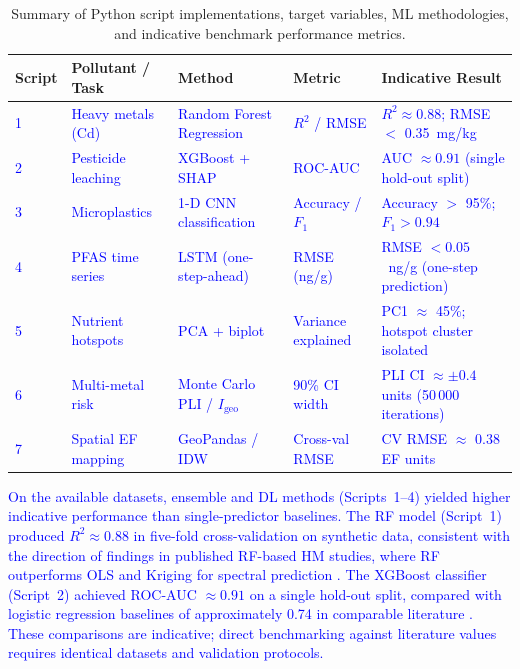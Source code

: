 \documentclass[environments,article,submit,pdftex,moreauthors]{Definitions/mdpi}
\begin{document}
\begin{table}[H]
\caption{Summary of Python script implementations, target variables,
    ML methodologies, and indicative benchmark performance
    metrics.\label{tab:script_results}}
\begin{tabularx}{\textwidth}{@{} p{1.0cm} p{2.8cm} p{2.5cm} p{2.5cm} X @{}}
\toprule
\textbf{Script} & \textbf{Pollutant / Task}
    & \textbf{Method}
    & \textbf{Metric}
    & \textbf{Indicative Result} \\
\midrule
\textcolor{blue}{1} & \textcolor{blue}{Heavy metals (Cd)}
    & \textcolor{blue}{Random Forest Regression}
    & \textcolor{blue}{$R^2$ / RMSE}
    & \textcolor{blue}{$R^2 \approx 0.88$; RMSE $<$ 0.35~mg/kg} \\[4pt]
\textcolor{blue}{2} & \textcolor{blue}{Pesticide leaching}
    & \textcolor{blue}{XGBoost + SHAP}
    & \textcolor{blue}{ROC-AUC}
    & \textcolor{blue}{AUC $\approx 0.91$ (single hold-out split)} \\[4pt]
\textcolor{blue}{3} & \textcolor{blue}{Microplastics}
    & \textcolor{blue}{1-D CNN classification}
    & \textcolor{blue}{Accuracy / $F_1$}
    & \textcolor{blue}{Accuracy $>$ 95\%; $F_1 > 0.94$} \\[4pt]
\textcolor{blue}{4} & \textcolor{blue}{PFAS time series}
    & \textcolor{blue}{LSTM (one-step-ahead)}
    & \textcolor{blue}{RMSE (ng/g)}
    & \textcolor{blue}{RMSE $< 0.05$~ng/g (one-step prediction)} \\[4pt]
\textcolor{blue}{5} & \textcolor{blue}{Nutrient hotspots}
    & \textcolor{blue}{PCA + biplot}
    & \textcolor{blue}{Variance explained}
    & \textcolor{blue}{PC1 $\approx$ 45\%; hotspot cluster isolated} \\[4pt]
\textcolor{blue}{6} & \textcolor{blue}{Multi-metal risk}
    & \textcolor{blue}{Monte Carlo PLI / $I_\mathrm{geo}$}
    & \textcolor{blue}{90\% CI width}
    & \textcolor{blue}{PLI CI $\approx \pm 0.4$ units (50\,000 iterations)} \\[4pt]
\textcolor{blue}{7} & \textcolor{blue}{Spatial EF mapping}
    & \textcolor{blue}{GeoPandas / IDW}
    & \textcolor{blue}{Cross-val RMSE}
    & \textcolor{blue}{CV RMSE $\approx$ 0.38 EF units} \\
\bottomrule
\end{tabularx}
\end{table}

\textcolor{blue}{On the available datasets, ensemble and DL methods (Scripts~1--4) yielded higher indicative performance than single-predictor baselines. The RF model (Script~1) produced $R^2 \approx 0.88$ in five-fold cross-validation on synthetic data, consistent with the direction of findings in published RF-based HM studies, where RF outperforms OLS and Kriging for spectral prediction \cite{Guan}. The XGBoost classifier (Script~2) achieved ROC-AUC $\approx 0.91$ on a single hold-out split, compared with logistic regression baselines of approximately 0.74 in comparable literature \cite{PerezLucas2025}. These comparisons are indicative; direct benchmarking against literature values requires identical datasets and validation protocols.}
\end{document}
